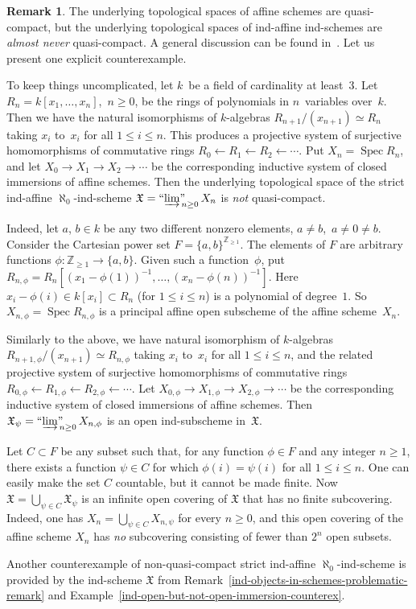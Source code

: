 \documentclass[12pt,a4paper]{amsart}
\newcommand{\+}{\protect\nobreakdash-}
\renewcommand{\:}{\colon}
\newcommand{\rarrow}{\longrightarrow}
\newcommand{\larrow}{\longleftarrow}
\DeclareMathOperator{\Spec}{Spec}
\newcommand{\ilim}
 {\mathop{\text{\normalfont``$\varinjlim$''\!\!}}\nolimits}
\newcommand{\fX}{\mathfrak X}
\newcommand{\boZ}{\mathbb Z}
\theoremstyle{plain}
\theoremstyle{definition}
\newtheorem{rem}[thm]{Remark}
\begin{document}
\begin{rem}
 The underlying topological spaces of affine schemes are quasi-compact,
but the underlying topological spaces of ind-affine ind-schemes are
\emph{almost never} quasi-compact.
 A general discussion can be found in~\cite[Section~1.4]{Rich}.
 Let us present one explicit counterexample.

 To keep things uncomplicated, let $k$~be a field of cardinality
at least~$3$.
 Let $R_n=k[x_1,\dotsc,x_n]$, \,$n\ge0$, be the rings of polynomials
in $n$~variables over~$k$.
 Then we have the natural isomorphisms of $k$\+algebras
$R_{n+1}/(x_{n+1})\simeq R_n$ taking $x_i$ to~$x_i$ for all
$1\le i\le n$.
 This produces a projective system of surjective homomorphisms
of commutative rings $R_0\larrow R_1\larrow R_2\larrow\dotsb$.
 Put $X_n=\Spec R_n$, and let $X_0\rarrow X_1\rarrow X_2\rarrow\dotsb$
be the corresponding inductive system of closed immersions of
affine schemes.
 Then the underlying topological space of the strict ind-affine
$\aleph_0$\+ind-scheme $\fX=\ilim_{n\ge0}X_n$ is \emph{not}
quasi-compact.
 
 Indeed, let $a$, $b\in k$ be any two different nonzero elements,
$a\ne b$, \,$a\ne0\ne b$.
 Consider the Cartesian power set $F=\{a,b\}^{\boZ_{\ge1}}$.
 The elements of $F$ are arbitrary functions $\phi\:\boZ_{\ge1}
\rarrow\{a,b\}$.
 Given such a function~$\phi$, put
$R_{n,\phi}=R_n[(x_1-\phi(1))^{-1},\dotsc,(x_n-\phi(n))^{-1}]$.
 Here $x_i-\phi(i)\in k[x_i]\subset R_n$ (for $1\le i\le n$) is
a polynomial of degree~$1$.
 So $X_{n,\phi}=\Spec R_{n,\phi}$ is a principal affine open subscheme
of the affine scheme~$X_n$.

 Similarly to the above, we have natural isomorphism of $k$\+algebras
$R_{n+1,\phi}/(x_{n+1})\simeq R_{n,\phi}$ taking $x_i$ to~$x_i$ for all
$1\le i\le n$, and the related projective system of surjective
homomorphisms of commutative rings $R_{0,\phi}\larrow R_{1,\phi}
\larrow R_{2,\phi}\larrow\dotsb$.
 Let $X_{0,\phi}\rarrow X_{1,\phi}\rarrow X_{2,\phi}\rarrow\dotsb$
be the corresponding inductive system of closed immersions of
affine schemes.
 Then $\fX_\psi=\ilim_{n\ge0}X_{n,\phi}$ is an open ind-subscheme
in~$\fX$.

 Let $C\subset F$ be any subset such that, for any function
$\phi\in F$ and any integer $n\ge1$, there exists a function
$\psi\in C$ for which $\phi(i)=\psi(i)$ for all $1\le i\le n$.
 One can easily make the set $C$ countable, but it cannot be made
finite.
 Now $\fX=\bigcup_{\psi\in C}\fX_\psi$ is an infinite open covering
of $\fX$ that has no finite subcovering.
 Indeed, one has $X_n=\bigcup_{\psi\in C} X_{n,\psi}$ for every
$n\ge0$, and this open covering of the affine scheme $X_n$ has
\emph{no} subcovering consisting of fewer than $2^n$ open subsets.

 Another counterexample of non-quasi-compact strict ind-affine
$\aleph_0$\+ind-scheme is provided by the ind-scheme $\fX$ from
Remark~\ref{ind-objects-in-schemes-problematic-remark} and
Example~\ref{ind-open-but-not-open-immersion-counterex}.
\end{rem}
\end{document}
